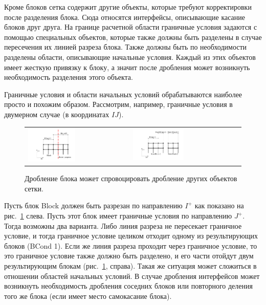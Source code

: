 Кроме блоков сетка содержит другие объекты, которые требуют корректировки после разделения блока.
Сюда относятся интерфейсы, описывающие касание блоков друг друга.
На границе расчетной области граничные условия задаются с помощью специальных объектов, которые также должны быть разделены в случае пересечения их линией разреза блока.
Также должны быть по необходимости разделены области, описывающие начальные условия.
Каждый из этих объектов имеет жесткую привязку к блоку, а значит после дробления может возникнуть
необходимость разделения этого объекта.

Граничные условия и области начальных условий обрабатываются наиболее просто и похожим образом.
Рассмотрим, например, граничные условия в двумерном случае (в координатах $IJ$).

\begin{figure}[ht]
\centering
\begin{tabular}{ll}
\includegraphics[width=0.48\textwidth]{fig/par_cut-bcond.pdf}
&
\includegraphics[width=0.48\textwidth]{fig/par_cut-bcond2.pdf}
\end{tabular}
\singlespacing
{}\caption{Дробление блока может спровоцировать дробление других объектов сетки.}
\label{fig:text_2_withcut_cut_bcond}
\end{figure}

Пусть блок Block должен быть разрезан по направлению $I^{+}$ как показано на рис.~\ref{fig:text_2_withcut_cut_bcond} слева.
Пусть этот блок имеет граничные условия по направлению $J^{+}$.
Тогда возможны два варианта.
Либо линия разреза не пересекает граничное условие, и тогда граничное условие целиком отходит одному из результирующих блоков (BCond 1).
Если же линия разреза проходит через граничное условие, то это граничное условие также должно быть разделено, и его части отойдут двум результирующим блокам (рис.~\ref{fig:text_2_withcut_cut_bcond}, справа).
Такая же ситуация может сложиться в отношении областей начальных условий.
В случае дробления интерфейсов может возникнуть необходимость дробления соседних блоков или повторного деления того же блока (если имеет место самокасание блока).

